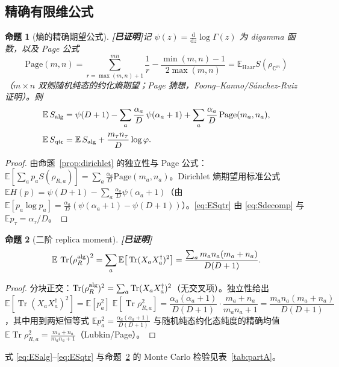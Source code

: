 \documentclass[11pt,a4paper]{ctexart}
\newtheorem{proposition}{命题}
\theoremstyle{definition}
\newcommand{\proved}{\textcolor{green!45!black}{\textbf{[已证明]}}}
\newcommand{\Tr}{\operatorname{Tr}}
\newcommand{\E}{\mathbb{E}}
\newcommand{\C}{\mathbb{C}}
\newcommand{\ph}{\varphi}
\newcommand{\Nalg}{S_{\rm alg}}
\newcommand{\Nqtr}{S_{\rm qtr}}
\newcommand{\Page}{\mathrm{Page}}
\newcommand{\dd}{\mathrm{d}}
\begin{document}
\subsection{精确有限维公式}

\begin{proposition}[熵的精确期望公式]\proved{}\label{prop:entropy}
记 $\psi(z)=\frac{\dd}{\dd z}\log\Gamma(z)$ 为 digamma 函数，以及 Page 公式
\begin{equation}\label{eq:page}
\Page(m,n)=\sum_{r=\max(m,n)+1}^{mn}\frac1r-\frac{\min(m,n)-1}{2\max(m,n)}=\E_{\text{Haar}}S\!\left(\rho_{\C^m}\right)
\end{equation}
（$m\times n$ 双侧随机纯态的约化熵期望；Page 猜想，Foong--Kanno/S\'anchez-Ruiz 证明）。则
\begin{align}
\E\,\Nalg&=\psi(D+1)-\sum_a\frac{\alpha_a}{D}\,\psi(\alpha_a+1)
+\sum_a\frac{\alpha_a}{D}\,\Page(m_a,n_a),\label{eq:ESalg}\\[2pt]
\E\,\Nqtr&=\E\,\Nalg+\frac{m_\tau n_\tau}{D}\log\ph .\label{eq:ESqtr}
\end{align}
\end{proposition}
\begin{proof}
由命题~\ref{prop:dirichlet} 的独立性与 Page 公式：
$\E[\sum_ap_aS(\rho_{R,a})]=\sum_a\frac{\alpha_a}{D}\Page(m_a,n_a)$。Dirichlet 熵期望用标准公式
$\E H(p)=\psi(D+1)-\sum_a\frac{\alpha_a}{D}\psi(\alpha_a+1)$（由 $\E[p_a\log p_a]=\frac{\alpha_a}{D}(\psi(\alpha_a+1)-\psi(D+1))$）。\eqref{eq:ESqtr} 由 \eqref{eq:Sdecomp} 与 $\E p_\tau=\alpha_\tau/D$。
\end{proof}

\begin{proposition}[二阶 replica moment]\proved{}\label{prop:second}
\[
\E\,\Tr\!\big(\rho_R^{\rm alg}\big)^2=\sum_a \E\big[\Tr(X_aX_a^\dagger)^2\big]
=\frac{\sum_a m_an_a(m_a+n_a)}{D(D+1)} .
\]
\end{proposition}
\begin{proof}
分块正交：$\Tr(\rho_R^{\rm alg})^2=\sum_a\Tr(X_aX_a^\dagger)^2$（无交叉项）。独立性给出
\[
\E[\Tr(X_aX_a^\dagger)^2]=\E[p_a^2]\;\E[\Tr\rho_{R,a}^2]=\frac{\alpha_a(\alpha_a+1)}{D(D+1)}\cdot\frac{m_a+n_a}{m_an_a+1}=\frac{m_an_a(m_a+n_a)}{D(D+1)}
\]
，其中用到两矩恒等式 $\E p_a^2=\frac{\alpha_a(\alpha_a+1)}{D(D+1)}$ 与随机纯态约化态纯度的精确均值 $\E\Tr\rho_{R,a}^2=\frac{m_a+n_a}{m_an_a+1}$（Lubkin/Page）。
\end{proof}

式 \eqref{eq:ESalg}--\eqref{eq:ESqtr} 与命题~\ref{prop:second} 的 Monte Carlo 检验见表~\ref{tab:partA}。
\end{document}
